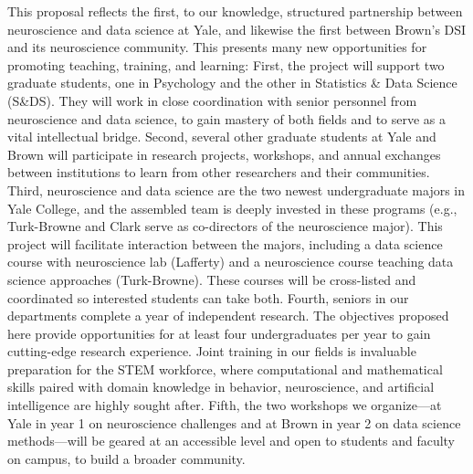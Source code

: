 
This proposal reflects the first, to our knowledge, structured
partnership between neuroscience and data science at Yale, and likewise the first between Brown's DSI and its neuroscience community. This
presents many new opportunities for promoting teaching, training, and
learning: First, the project will support two graduate students, one in
Psychology and the other in Statistics \& Data Science (S\&DS). They will
work in close coordination with senior personnel from neuroscience
and data science, to gain mastery of both fields and to serve as a vital intellectual bridge. Second, several other
graduate students at Yale and Brown will participate in research
projects, workshops, and annual exchanges between institutions to learn
from other researchers and their communities. Third, neuroscience and data
science are the two newest undergraduate majors in Yale College, and the
assembled team is deeply invested in these programs (e.g., Turk-Browne
and Clark serve as co-directors of the neuroscience major). This project
will facilitate interaction between the majors, including a data science
course with neuroscience lab (Lafferty) and a neuroscience course
teaching data science approaches (Turk-Browne). These courses will be
cross-listed and coordinated so interested students can take both.
Fourth, seniors in our departments complete a year of independent
research. The objectives proposed here provide opportunities for at least four
undergraduates per year to gain cutting-edge research experience. Joint
training in our fields is invaluable preparation for the STEM workforce,
where computational and mathematical skills paired with domain knowledge
in behavior, neuroscience, and artificial intelligence are highly sought
after. Fifth, the two workshops we organize---at Yale in year 1 on
neuroscience challenges and at Brown in year 2 on data science methods---will be geared at an accessible level and open to students and faculty on campus, to build
a broader community.

